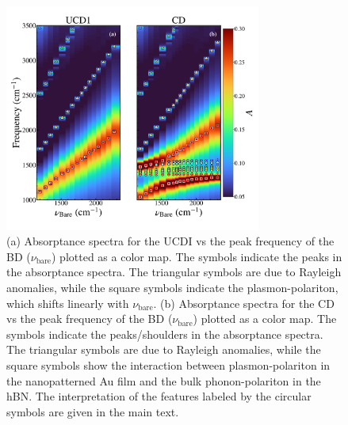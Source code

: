 \documentclass[preprint,
amsmath,amssymb,
aip,
jap,
floatfix,]{revtex4-2}
\begin{document}
			\begin{figure}[!htb]
			  \includegraphics[width=0.75\textwidth]{Figures/Fig3.pdf}
			  \caption{(a) Absorptance spectra for the UCDI vs the peak frequency of the BD ($\nu_\mathrm{bare}$) plotted as a color map. The symbols indicate the peaks in the absorptance spectra. The triangular symbols are due to Rayleigh anomalies, while the square symbols indicate the plasmon-polariton, which shifts linearly with $\nu_\mathrm{bare}$.
			    (b) Absorptance spectra for the CD vs the peak frequency of the BD ($\nu_\mathrm{bare}$) plotted as a color map. The symbols indicate the peaks/shoulders in the absorptance spectra. The triangular symbols are due to Rayleigh anomalies, while the square symbols show the interaction between plasmon-polariton in the nanopatterned Au film and the bulk phonon-polariton in the hBN. The interpretation of the features labeled by the circular symbols are given in the main text.}
			  \label{fig:3.8}
			\end{figure}
\end{document}
